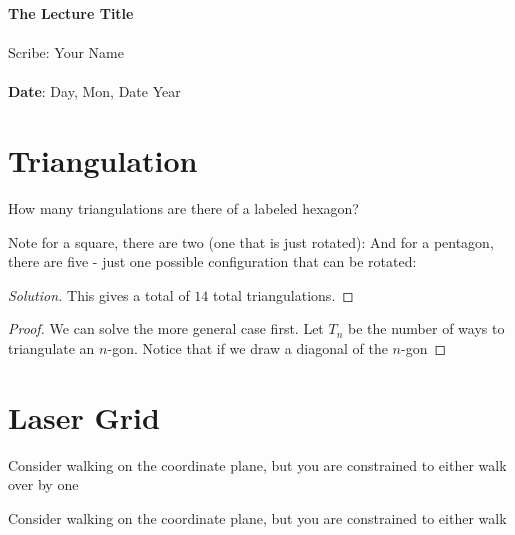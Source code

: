 \documentclass[11pt,twosided]{article}
\def\titlestring{The Lecture Title}
\def\scribestring{Your Name}
\def\datestring{Day, Mon, Date Year}
\begin{document}
\thispagestyle{plain}  %

\noindent
{\LARGE \textbf{\titlestring}}\\\\
%
{\Large Scribe: \scribestring}\\ \\
{\textbf{Date}: \datestring}


\noindent

\section{Triangulation}
\begin{problem}{1}
How many triangulations are there of a labeled hexagon? 
\end{problem}
Note for a square, there are two  (one that is just rotated):  
And for a pentagon, there are five - just one possible configuration that can be rotated: 
\begin{proof}[Solution]
This gives a total of $\boxed{14}$ total triangulations. 
\end{proof}
\begin{proof}
We can solve the more general case first. Let $T_n$ be the number of ways to triangulate an $n$-gon. Notice that if we draw a diagonal of the $n$-gon 

\end{proof}

\section{Laser Grid}
\begin{problem}
	Consider walking on the coordinate plane, but you are constrained to either walk over by one 
\end{problem}

\begin{solution}

\end{solution}

\begin{problem}{2}
	Consider walking on the coordinate plane, but you are constrained to either walk 
\end{problem}
\end{document}
